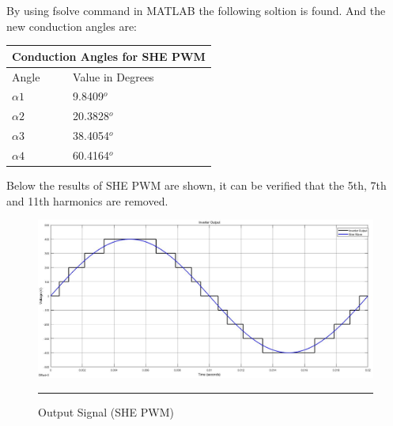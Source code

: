 By using fsolve command in MATLAB the following soltion is found. And the new conduction angles are:
 
 \begin{center}
 	\begin{tabular}{ |p{4cm}||p{4cm}|  }
 		\hline
 		\multicolumn{2}{|c|}{Conduction Angles for SHE PWM} \\
 		\hline
 		Angle & Value in Degrees\\
 		\hline
 		$\alpha1$ & 9.8409$^o$\\
 		\hline
 		$\alpha2$ & 20.3828$^o$\\
 		\hline
 		$\alpha3$ & 38.4054$^o$\\
 		\hline
 		$\alpha4$ & 60.4164$^o$\\
 		\hline
 	\end{tabular}
 \end{center}
 
 Below the results of SHE PWM are shown, it can be verified that the 5th, 7th and 11th harmonics are removed.
 
\begin{figure}[htbp]
	\centering
	\includegraphics[width = 6in]{./Figures/Photos/Simulink/SHE_Out.jpg}
	\rule{35em}{1pt}
	\caption{Output Signal (SHE PWM)}
\end{figure}

